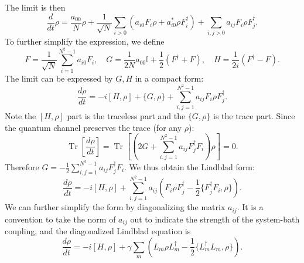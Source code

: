 \documentclass[aps,prx,superscriptaddress,nofootinbib]{revtex4}
\def \Tr{\operatorname{Tr}}
\begin{document}
The limit is then
$$
	\frac{d}{dt}\rho 
	= \frac{a_{00}}{N}\rho + \frac{1}{\sqrt N} \sum_{i>0} \left(a_{i0} F_i \rho + a_{i0}^*\rho F_i^\dagger\right) + \sum_{i,j>0} a_{ij} F_i \rho F_j^\dagger. 
$$
To further simplify the expression, we define
$$
	F = \frac{1}{\sqrt N} \sum_{i=1}^{N^2-1} a_{i0} F_i, \quad
	G = \frac{1}{2N}a_{00}\mathbb I +\frac{1}{2}(F^\dagger+F), \quad
	H = \frac{1}{2i}(F^\dagger-F).
$$
The limit can be expressed by $G,H$ in a compact form:
\begin{equation}
	\frac{d\rho}{dt} = -i[H,\rho]+\{G, \rho\}+\sum_{i,j=1}^{N^2-1}a_{ij}F_i\rho F_j^\dagger.
\end{equation}
Note the $[H,\rho]$ part is the traceless part and the $\{G,\rho\}$ is the trace part. Since the quantum channel preserves the trace (for any $\rho$):
$$
\Tr\left[\frac{d\rho}{dt}\right]= \Tr\left[ \left(2G+\sum_{i,j=1}^{N^2-1}a_{ij}F_j^\dagger F_i \right)\rho \right]=0.
$$
Therefore $G = -\frac{1}{2}\sum_{i,j=1}^{N^2-1}a_{ij}F_j^\dagger F_i$. We thus obtain the Lindblad form:
$$
\frac{d\rho}{dt} = -i[H,\rho]+\sum_{i,j=1}^{N^2-1}a_{ij} \left(F_i\rho F_j^\dagger-\frac{1}{2}\{F_j^\dagger F_i, \rho\} \right).
$$
We can further simplify the form by diagonalizing the matrix $a_{ij}$. It is a convention to take the norm of $a_{ij}$ out to indicate the strength of the system-bath coupling, and the diagonalized Lindblad equation is
\begin{equation}\label{eq:lindbladian}
	\frac{d\rho}{dt} = -i[H,\rho]+ \gamma\sum_{m} \left(L_m\rho L_m^\dagger-\frac{1}{2}\{L_m^\dagger L_m, \rho\} \right).
\end{equation}
\end{document}

